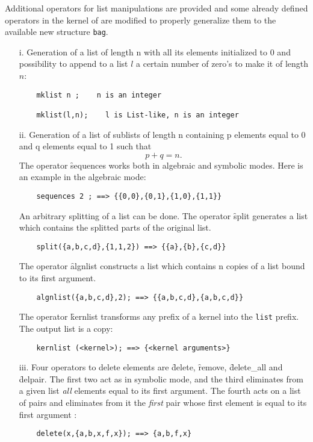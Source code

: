 Additional operators for list manipulations are provided and some already
defined operators in the kernel of \REDUCE are modified to properly
generalize them to the available new structure \texttt{bag}.
\begin{itemize}
\item[i.]
\hypertarget{operator:MKLIST}{}%
Generation of a list of length n with all its elements initialized to 0
and possibility to append to a list $l$ a certain number of
zero's to make it of length $n$:
\begin{verbatim}
    mklist n ;    n is an integer

    mklist(l,n);    l is List-like, n is an integer
\end{verbatim}

\item[ii.]
\hypertarget{operator:SEQUENCES}{}%
Generation of a list of sublists of length n containing p elements
equal to 0 and q elements equal to 1 such that  \[p+q=n .\]
The operator \f{sequences} works both in algebraic and
symbolic modes.  Here is an example in the algebraic mode:
\begin{verbatim}
    sequences 2 ; ==> {{0,0},{0,1},{1,0},{1,1}}
\end{verbatim}
\hypertarget{operator:SPLIT}{}%
An arbitrary splitting of a list can be done. The operator \f{split} 
generates a list which contains the splitted parts of the original list.
\begin{verbatim}
    split({a,b,c,d},{1,1,2}) ==> {{a},{b},{c,d}}
\end{verbatim}
\hypertarget{operator:ALGNLIST}{}%
The operator \f{algnlist} constructs a list which contains n copies  
of a list bound to its first argument.
\begin{verbatim}
    algnlist({a,b,c,d},2); ==> {{a,b,c,d},{a,b,c,d}}
\end{verbatim}
\hypertarget{operator:KERNLIST}{}%
The operator \f{kernlist} transforms any prefix of a kernel into the
\texttt{list} prefix. The output list is a copy:
\begin{verbatim}
    kernlist (<kernel>); ==> {<kernel arguments>}
\end{verbatim}
\item[iii.]
\hypertarget{operator:DELETE}{}
\hypertarget{operator:DELETE_ALL}{}
\hypertarget{operator:DELPAIR}{}
\hypertarget{operator:REMOVE}{}
Four operators to delete elements are \f{delete}, \f{remove}, \f{delete\_all} and
\f{delpair}. The first two act as in symbolic mode, and the third
eliminates from a given list \emph{all}
elements equal to its first argument. The fourth acts on a list of pairs
and eliminates from it the \emph{first} pair whose first element is equal to
its first argument :
\begin{verbatim}
    delete(x,{a,b,x,f,x}); ==> {a,b,f,x}


\end{verbatim}
\end{itemize}
